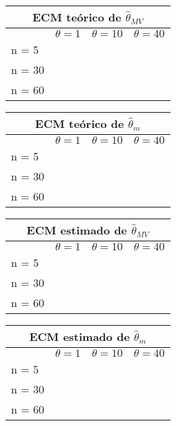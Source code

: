 \documentclass[a4paper,spanish]{report}
\begin{document}
\begin{table}[h!]
	\begin{tabular}{|l | c | c | c |}
		\hline
		\multicolumn{4}{|c|}{ECM te\'orico de $\hat{\theta}_{MV}$} \\	
		\hline
		 & $\theta = 1$ & $\theta = 10$ & $\theta = 40$  \\
		\hline 
		n = 5 & & & \\
		\hline
		n = 30 & & & \\
		\hline
		n = 60 & & & \\
		\hline
	\end{tabular}
\end{table}

\begin{table}[h!]
	\begin{tabular}{|l | c | c | c |}
		\hline
		\multicolumn{4}{|c|}{ECM te\'orico de $\hat{\theta}_{m}$} \\	
		\hline
		 & $\theta = 1$ & $\theta = 10$ & $\theta = 40$  \\
		\hline 
		n = 5 & & & \\
		\hline
		n = 30 & & & \\
		\hline
		n = 60 & & & \\
		\hline
	\end{tabular}
\end{table}

\begin{table}[h!]
	\begin{tabular}{|l | c | c | c |}
		\hline
		\multicolumn{4}{|c|}{ECM estimado de $\hat{\theta}_{MV}$} \\	
		\hline
		 & $\theta = 1$ & $\theta = 10$ & $\theta = 40$  \\
		\hline 
		n = 5 & & & \\
		\hline
		n = 30 & & & \\
		\hline
		n = 60 & & & \\
		\hline
	\end{tabular}
\end{table}

\begin{table}[h!]
	\begin{tabular}{|l | c | c | c |}
		\hline
		\multicolumn{4}{|c|}{ECM estimado de $\hat{\theta}_{m}$} \\	
		\hline
		 & $\theta = 1$ & $\theta = 10$ & $\theta = 40$  \\
		\hline 
		n = 5 & & & \\
		\hline
		n = 30 & & & \\
		\hline
		n = 60 & & & \\
		\hline
	\end{tabular}
\end{table}
\end{document}
